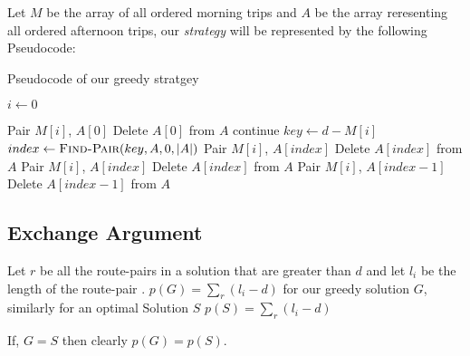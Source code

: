 \documentclass[8pt]{article}
\begin{document}
Let $M$ be the array of all ordered morning trips and $A$ be the array reresenting all ordered afternoon trips, our \textit{strategy} will be represented by the following Pseudocode:

\begin{algorithm}
\caption{Pseudocode of our greedy stratgey}\label{euclid}
\begin{algorithmic}[1]

\State $i \leftarrow 0$

        \State Pair $M[i]$, $A[0]$
        \State Delete $A[0]$ from $A$
        \State continue
    \EndIf
    \State $key \leftarrow d - M[i]$
    \State $index \leftarrow \Call{Find-Pair}{key, A, 0, \left\vert{A}\right\vert}$
        \State Pair $M[i]$, $A[index]$
        \State Delete $A[index]$ from $A$
    \Else
            \State Pair $M[i]$, $A[index]$
            \State Delete $A[index]$ from $A$
        \Else
            \State Pair $M[i]$, $A[index - 1]$
            \State Delete $A[index - 1]$ from $A$
        \EndIf
    \EndIf
\EndWhile
\EndProcedure
\end{algorithmic}
\end{algorithm}

\subsection{Exchange Argument}
Let $r$ be all the route-pairs in a solution that are greater than $d$ and let $l_i$ be the length of the route-pair . $p(G) = \sum_{r}(l_i - d)$ for our greedy solution $G$, similarly for an optimal Solution $S$ $p(S) = \sum_{r}(l_i - d)$

If, $G = S$ then clearly $p(G) = p(S)$.
\end{document}
